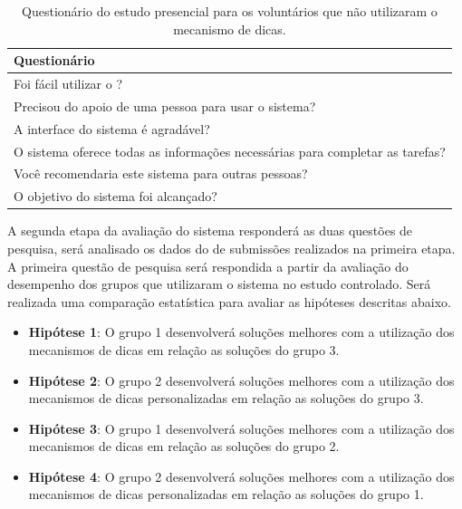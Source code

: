 \begin{table}[ht]
	\centering
	\captionsetup{justification=centering}
	\caption{Questionário do estudo presencial para os voluntários que não utilizaram o mecanismo de dicas.}
	\label{tabela:questionárioestudosemdica}
	\begin{tabular}{l}
		\hline
		Questionário                        											\\ \hline
		Foi fácil utilizar o \foreign{iHint}?                            				\\
		Precisou do apoio de uma pessoa para usar o sistema?                           	\\
		A interface do sistema é agradável?                        						\\
		O sistema oferece todas as informações necessárias para completar as tarefas?   \\
		Você recomendaria este sistema para outras pessoas?                           	\\
		O objetivo do sistema foi alcançado? 											\\ \hline
	\end{tabular}
\end{table}

A segunda etapa da avaliação do sistema responderá as duas questões de pesquisa, será analisado os dados do  de submissões realizados na primeira etapa. A primeira questão de pesquisa será respondida a partir da avaliação do desempenho dos grupos que utilizaram o sistema no estudo controlado. Será realizada uma comparação estatística para avaliar as hipóteses descritas abaixo. 

\begin{itemize}
	\item \textbf{Hipótese 1}: O grupo 1 desenvolverá soluções melhores com a utilização dos mecanismos de dicas em relação as soluções do grupo 3.
	\item \textbf{Hipótese 2}: O grupo 2 desenvolverá soluções melhores com a utilização dos mecanismos de dicas personalizadas em relação as soluções do grupo 3.	
	\item \textbf{Hipótese 3}: O grupo 1 desenvolverá soluções melhores com a utilização dos mecanismos de dicas em relação as soluções do grupo 2.	
	\item \textbf{Hipótese 4}: O grupo 2 desenvolverá soluções melhores com a utilização dos mecanismos de dicas personalizadas em relação as soluções do grupo 1.
\end{itemize}

